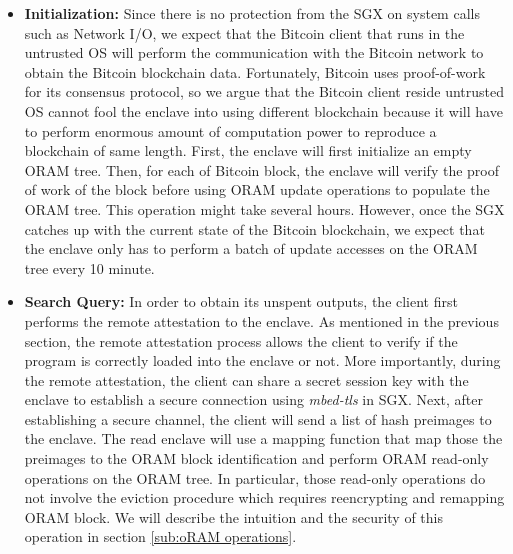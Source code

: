 \begin{itemize}
 	\item \textbf{Initialization:}
	Since there is no protection from the SGX on system calls such as Network I/O, 
	we expect that the Bitcoin client that runs in the untrusted OS will perform the communication with the Bitcoin network to obtain the Bitcoin blockchain data.
	Fortunately, Bitcoin uses proof-of-work for its consensus protocol, 
	so we argue that the Bitcoin client reside untrusted OS cannot fool the enclave into using different blockchain because it will have to perform enormous amount of computation power to reproduce a blockchain of same length. 
	First, the enclave will first initialize an empty ORAM tree. 
	Then, for each of Bitcoin block, the enclave will verify the proof of work of the block before using ORAM update operations to populate the ORAM tree. 
	This operation might take several hours. 
	However, once the SGX catches up with the current state of the Bitcoin blockchain, we expect that the enclave only has to perform a batch of update accesses on the ORAM tree every 10 minute.

	\item \textbf{Search Query:} In order to obtain its unspent outputs, the client first performs the remote attestation to the enclave. 
	As mentioned in the previous section, the remote attestation process allows the client to verify if the program is correctly loaded into the enclave or not. 
	More importantly, during the remote attestation, the client can share a secret session key with the enclave to establish a secure connection using \textit{mbed-tls} in SGX. 
	Next, after establishing a secure channel, the client will send a list of hash preimages to the enclave. 
	The read enclave will use a mapping function that map those the preimages to the ORAM block identification and perform ORAM read-only operations on the ORAM tree. 
	In particular, those read-only operations do not involve the eviction procedure which requires reencrypting and remapping ORAM block. 
	We will describe the intuition and the security of this operation in section \ref{sub:oRAM operations}.


\end{itemize}
